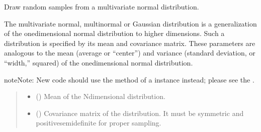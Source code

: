 \documentclass[letterpaper,10pt,english]{sphinxmanual}
\begin{document}
\begin{fulllineitems}
\label{\detokenize{metilda.controllers:metilda.controllers.pitch_art_wizard.multivariate_normal}}
\pysigstartsignatures
{}
\pysigstopsignatures
\sphinxAtStartPar
Draw random samples from a multivariate normal distribution.

\sphinxAtStartPar
The multivariate normal, multinormal or Gaussian distribution is a
generalization of the one\sphinxhyphen{}dimensional normal distribution to higher
dimensions.  Such a distribution is specified by its mean and
covariance matrix.  These parameters are analogous to the mean
(average or “center”) and variance (standard deviation, or “width,”
squared) of the one\sphinxhyphen{}dimensional normal distribution.

\begin{sphinxadmonition}{note}{Note:}
\sphinxAtStartPar
New code should use the
method of a  instance instead;
please see the .
\end{sphinxadmonition}
\begin{quote}\begin{description}
\begin{itemize}
\item {} 
\sphinxAtStartPar
{} () \textendash{} Mean of the N\sphinxhyphen{}dimensional distribution.

\item {} 
\sphinxAtStartPar
{} (\sphinxstyleliteralemphasis{\sphinxupquote{ (}}\sphinxstyleliteralemphasis{\sphinxupquote{, }}\sphinxstyleliteralemphasis{\sphinxupquote{)}}) \textendash{} Covariance matrix of the distribution. It must be symmetric and
positive\sphinxhyphen{}semidefinite for proper sampling.


\end{itemize}
\end{description}
\end{quote}
\end{fulllineitems}
\end{document}
